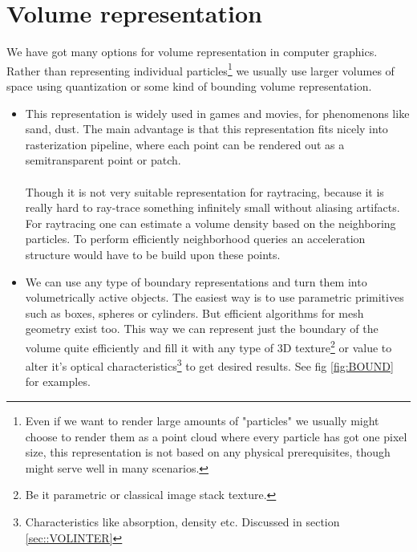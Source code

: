 \clearpage{}
\section{Volume representation}
We have got many options for volume representation in computer graphics. Rather than representing individual particles\footnote{Even if we want to render large amounts of "particles" we usually might choose to render them as a point cloud where every particle has got one pixel size, this representation is not based on any physical prerequisites, though might serve well in many scenarios.} we usually use larger volumes of space using quantization or some kind of bounding volume representation.

\begin{itemize}
\item {}
This representation is widely used in games and movies, for phenomenons like sand, dust. The main advantage is that this representation fits nicely into rasterization pipeline, where each point can be rendered out as a semitransparent point or patch. 
\\
\\
Though it is not very suitable representation for raytracing, because it is really hard to ray-trace something infinitely small without aliasing artifacts. For raytracing one can estimate a volume density based on the neighboring particles. To perform efficiently neighborhood queries an acceleration structure would have to be build upon these points.

\item {}
We can use any type of boundary representations and turn them into volumetrically active objects. The easiest way is to use parametric primitives such as boxes, spheres or cylinders. But efficient algorithms for mesh geometry exist too. This way we can represent just the boundary of the volume quite efficiently and fill it with any type of 3D texture\footnote{Be it parametric or classical image stack texture.} or value to alter it's optical characteristics\footnote{Characteristics like absorption, density etc. Discussed in section \ref{sec::VOLINTER}} to get desired results. See fig \ref{fig:BOUND} for examples.



\end{itemize}
